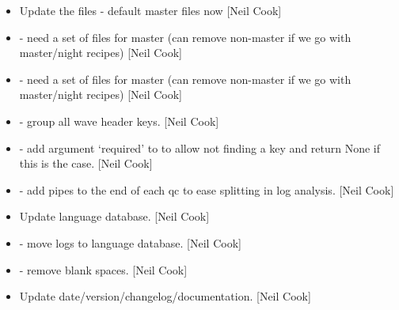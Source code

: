 \documentclass[a4paper,10pt,english]{report}
\begin{document}
\begin{itemize}
\item {} 
Update the  files - default master files now
 {[}Neil Cook{]}

\item {} 
 - need a set of files
for master (can remove non-master if we go with master/night recipes)
{[}Neil Cook{]}

\item {} 
 - need a set of files for
master (can remove non-master if we go with master/night recipes)
{[}Neil Cook{]}

\item {} 
 - group all wave header
keys. {[}Neil Cook{]}

\item {} 
 - add argument ‘required’ to
 to allow not finding a key and return None if this
is the case. {[}Neil Cook{]}

\item {} 
 - add pipes to the end of each qc to ease
splitting in log analysis. {[}Neil Cook{]}

\item {} 
Update language database. {[}Neil Cook{]}

\item {} 
 - move logs to language database. {[}Neil Cook{]}

\item {} 
 - remove blank spaces. {[}Neil Cook{]}

\item {} 
Update date/version/changelog/documentation. {[}Neil Cook{]}

\end{itemize}
\end{document}
